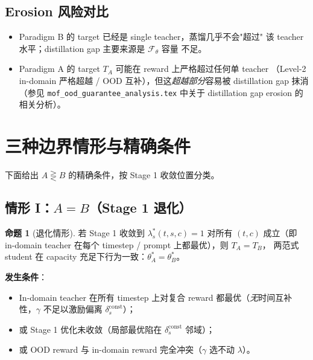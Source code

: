 \documentclass[11pt,a4paper]{article}
\newcommand{\const}{\mathrm{const}}
\theoremstyle{definition}
\newtheorem{proposition}{命题}
\begin{document}
\subsection{Erosion 风险对比}

\begin{itemize}[leftmargin=1.5em]
\item Paradigm B 的 target 已经是 single teacher，蒸馏几乎不会"超过"
该 teacher 水平；distillation gap 主要来源是 $\mathcal{F}_\theta$ 容量
不足。
\item Paradigm A 的 target $T_A$ 可能在 reward 上严格超过任何单 teacher
（Level-2 in-domain 严格超越 / OOD 互补），但这\emph{超越部分}容易被
distillation gap 抹消（参见
\texttt{mof\_ood\_guarantee\_analysis.tex} 中关于 distillation gap
erosion 的相关分析）。
\end{itemize}

\section{三种边界情形与精确条件}
\label{sec:cases}

下面给出 $A \gtreqless B$ 的精确条件，按 Stage 1 收敛位置分类。

\subsection{情形 I：$A = B$（Stage 1 退化）}

\begin{proposition}[退化情形]
\label{prop:degenerate}
若 Stage 1 收敛到 $\lambda_s^*(t, s, c) = 1$ 对所有 $(t, c)$ 成立（即
in-domain teacher 在每个 timestep / prompt 上都最优），则 $T_A = T_B$，
两范式 student 在 capacity 充足下行为一致：$\theta_A^* = \theta_B^*$。
\end{proposition}

\textbf{发生条件}：
\begin{itemize}[leftmargin=1.5em]
\item In-domain teacher 在所有 timestep 上对复合 reward 都最优（\emph{无}时间互补性，$\gamma$ 不足以激励偏离 $\delta_s^{\const}$）；
\item 或 Stage 1 优化未收敛（局部最优陷在 $\delta_s^{\const}$ 邻域）；
\item 或 OOD reward 与 in-domain reward 完全冲突（$\gamma$ 选不动 $\lambda$）。
\end{itemize}
\end{document}
